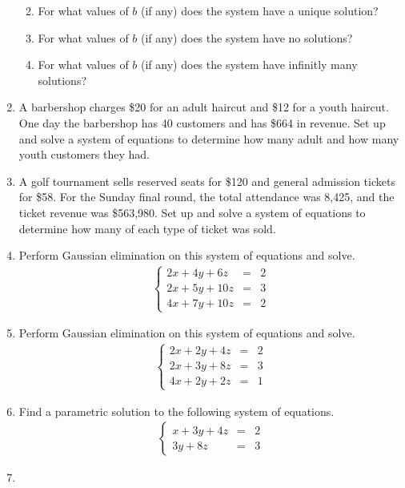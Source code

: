 \documentclass[
]{book}
\providecommand{\tightlist}{%
  \setlength{\itemsep}{0pt}\setlength{\parskip}{0pt}}
\theoremstyle{definition}
\theoremstyle{definition}
\theoremstyle{definition}
\theoremstyle{definition}
\theoremstyle{remark}
\begin{document}
\begin{enumerate}
  \begin{enumerate}
  \def\labelenumii{\alph{enumii}.}
  \tightlist
  \item
    For what values of \(b\) (if any) does the system have a unique solution?
  \item
    For what values of \(b\) (if any) does the system have no solutions?
  \item
    For what values of \(b\) (if any) does the system have infinitly many solutions?
  \end{enumerate}
\item
  A barbershop charges \$20 for an adult haircut and \$12 for a youth haircut. One day the barbershop has 40 customers and has \$664 in revenue. Set up and solve a system of equations to determine how many adult and how many youth customers they had.
\item
  A golf tournament sells reserved seats for \$120 and general admission tickets for \$58. For the Sunday final round, the total attendance was 8,425, and the ticket revenue was \$563,980. Set up and solve a system of equations to determine how many of each type of ticket was sold.
\item
  Perform Gaussian elimination on this system of equations and solve.
  \begin{align*}
  \left\{
  \begin{array}{rrr}
  2x+4y+6z&=&2\\
  2x+5y+10z&=&3\\
  4x+7y+10z&=&2
  \end{array}\right.
  \end{align*}
\item
  Perform Gaussian elimination on this system of equations and solve.
  \begin{align*}
  \left\{
  \begin{array}{rrr}
  2x+2y+4z&=&2\\
  2x+3y+8z&=&3\\
  4x+2y+2z&=&1
  \end{array}\right.
  \end{align*}
\item
  Find a parametric solution to the following system of equations.
  \begin{align*}
  \left\{
  \begin{array}{rrc}
  x+3y+4z&=&2\\
  3y+8z&=&3
  \end{array}\right.
  \end{align*}
\item

\end{enumerate}
\end{document}
